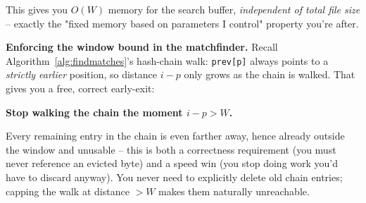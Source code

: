 \documentclass[11pt]{article}
\begin{document}
This gives you $O(W)$ memory for the search buffer, \emph{independent of total file
size} -- exactly the "fixed memory based on parameters I control" property you're
after.

\textbf{Enforcing the window bound in the matchfinder.} Recall
Algorithm~\ref{alg:findmatches}'s hash-chain walk: \texttt{prev[p]} always points to a
\emph{strictly earlier} position, so distance $i - p$ only grows as the chain is
walked. That gives you a free, correct early-exit:
\begin{center}
\textbf{Stop walking the chain the moment $i - p > W$.}
\end{center}
Every remaining entry in the chain is even farther away, hence already outside the
window and unusable -- this is both a correctness requirement (you must never reference
an evicted byte) and a speed win (you stop doing work you'd have to discard anyway). You
never need to explicitly delete old chain entries; capping the walk at distance $> W$
makes them naturally unreachable.
\end{document}
